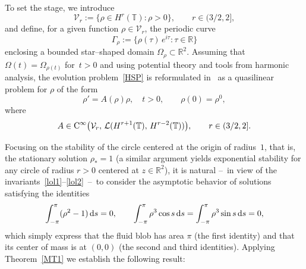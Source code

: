 \documentclass[reqno,11pt]{amsart}
\numberwithin{equation}{section}
\newcommand{\R}{\mathbb{R}}
\theoremstyle{remark}
\begin{document}
To set the stage, we introduce
\[
 \mathcal{V}_r:=\{\rho\in H^{ r}(\mathbb{T}) : \rho>0\}, \qquad r\in(3/2,2],
\]
and define, for a given function $\rho\in\mathcal{V}_r$, the periodic curve 
\[
\Gamma_\rho := \{ \rho(\tau)\,e^{i\tau} : \tau \in \mathbb{R} \}
\]
enclosing a bounded star–shaped domain $\Omega_\rho\subset\mathbb{R}^2$.
Assuming that $\Omega(t)=\Omega_{\rho(t)}$ for~${t>0}$ and using  potential theory and tools from harmonic analysis, the evolution problem~\eqref{HSP} is reformulated in~\cite{MW2025x} as a quasilinear problem for $\rho$ of the form
\begin{equation}\label{intrQPP}
\rho' = A(\rho)\rho, \quad t>0, \qquad \rho(0)=\rho^0,
\end{equation}
where 
\begin{equation}\label{regP:Ex2}
A \in {\rm C}^\infty\bigl(\mathcal{V}_r,\, \mathcal{L}(H^{r+1}(\mathbb{T}),\, H^{r-2}(\mathbb{T}))\bigr),\qquad r\in(3/2,2].
\end{equation}



Focusing on the stability of the circle centered at the origin  of radius~$1$, that is, the stationary solution $\rho_*=1$ (a similar argument yields exponential stability for any circle of radius $r>0$ centered at $z\in\R^2$), it is natural --~in view of the invariants~\mbox{\eqref{lol1}--\eqref{lol2}}~--~to consider the asymptotic behavior of solutions satisfying the identities
\begin{equation}\label{eqcons}
\int_{-\pi}^{\pi} (\rho^2 - 1)\, {\rm d}s = 0, \qquad
\int_{-\pi}^{\pi} \rho^3 \cos s\, {\rm d}s = \int_{-\pi}^{\pi} \rho^3 \sin s\, {\rm d}s = 0,
\end{equation}
which simply express that the fluid blob has area $\pi$ (the first identity) and that its center of mass is at $(0,0)$ (the second and third identities).
Applying Theorem~\ref{MT1} we establish  the following result:
\end{document}
